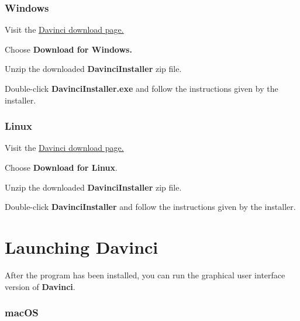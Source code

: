 \subsubsection{Windows}

\begin{boxitemize}
	\item Visit the \href{http://davinci.sazonov.org/}{Davinci download page.}
	\item Choose \textbf{Download for Windows.}
	\item Unzip the downloaded \textbf{DavinciInstaller} zip file.
	\item Double-click \textbf{DavinciInstaller.exe} and follow the instructions given by the installer.
\end{boxitemize}

\subsubsection{Linux}

\begin{boxitemize}
	\item Visit the \href{http://davinci.sazonov.org/}{Davinci download page.}
	\item Choose \textbf{Download for Linux}.
	\item Unzip the downloaded \textbf{DavinciInstaller} zip file.
	\item Double-click \textbf{DavinciInstaller} and follow the instructions given by the installer.
\end{boxitemize}

\section{Launching Davinci}

After the program has been installed, you can run the graphical user interface version of \textbf{Davinci}.

\subsubsection{macOS}

